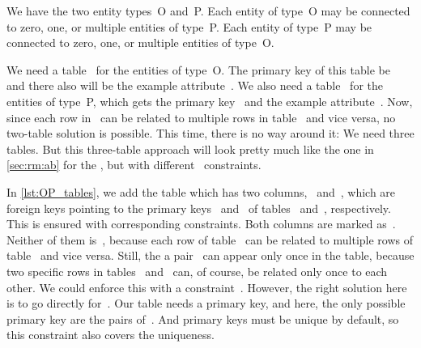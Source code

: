 %
%
\label{sec:rm:op}%
%
%
%
%
%
We have the two entity types~O and~P.
Each entity of type~O may be connected to zero, one, or multiple entities of type~P.
Each entity of type~P may be connected to zero, one, or multiple entities of type~O.

We need a table~ for the entities of type~O.
The primary key of this table be~ and there also will be the example attribute~.
We also need a table~ for the entities of type~P, which gets the primary key~ and the example attribute~.
Now, since each row in~ can be related to multiple rows in table~ and vice versa, no two-table solution is possible.
This time, there is no way around it:
We need three tables.
But this three-table approach will look pretty much like the one in \cref{sec:rm:ab} for the , but with different~ constraints.

In \cref{lst:OP_tables}, we add the table  which has two columns,~ and~, which are foreign keys pointing to the primary keys~ and~ of tables~ and~, respectively.
This is ensured with corresponding  constraints.
Both columns are marked as~.
Neither of them is~, because each row of table~ can be related to multiple rows of table~ and vice versa.
Still, the a pair~ can appear only once in the table, because two specific rows in tables~ and~ can, of course, be related only once to each other.
We could enforce this with a constraint~.
However, the right solution here is to go directly for~.
Our table needs a primary key, and here, the only possible primary key are the pairs of~.
And primary keys must be unique by default, so this constraint also covers the uniqueness.


